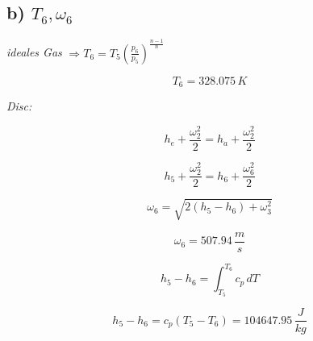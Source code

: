 \subsection*{b) $T_6, \omega_6$}

\textit{ideales Gas} $\Rightarrow T_6 = T_5 \left( \frac{p_6}{p_5} \right)^{\frac{n-1}{n}}$

\[ T_6 = 328.075 \, K \]

\textit{Disc:}

\[ h_e + \frac{\omega_2^2}{2} = h_a + \frac{\omega_2^2}{2} \]

\[ h_5 + \frac{\omega_2^2}{2} = h_6 + \frac{\omega_6^2}{2} \]

\[ \omega_6 = \sqrt{2(h_5 - h_6) + \omega_3^2} \]

\[ \omega_6 = 507.94 \, \frac{m}{s} \]

\[ h_5 - h_6 = \int_{T_5}^{T_6} c_p \, dT \]

\[ h_5 - h_6 = c_p (T_5 - T_6) = 104647.95 \, \frac{J}{kg} \]